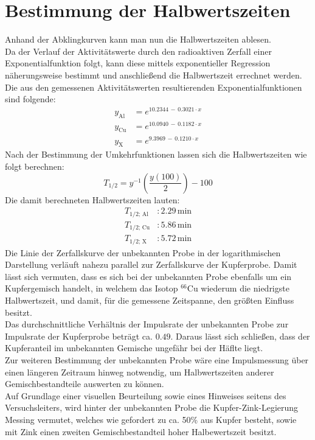 \documentclass[12pt,german]{article}
\begin{document}
    \section{Bestimmung der Halbwertszeiten}
    \noindent
    Anhand der Abklingkurven kann man nun die Halbwertszeiten ablesen. \\
    Da der Verlauf der Aktivitätswerte durch den radioaktiven Zerfall einer Exponentialfunktion folgt, kann diese mittels exponentieller Regression näherungsweise bestimmt und anschließend die Halbwertszeit errechnet werden.
    Die aus den gemessenen Aktivitätswerten resultierenden Exponentialfunktionen sind folgende:
    \begin{align*}
        y_\text{Al} &= e^{10.2344\, -\, 0.3021 \cdot x} \\
        y_\text{Cu} &= e^{10.0940\, - \, 0.1182 \cdot x} \\
        y_\text{X} &= e^{9.3969\, -\, 0.1210 \cdot x}
    \end{align*}
    Nach der Bestimmung der Umkehrfunktionen lassen sich die Halbwertszeiten wie folgt berechnen:
    \begin{equation*}
        T_{1/2} = y^{-1}\left(\frac{y(100)}{2}\right) - 100
    \end{equation*}
    Die damit berechneten Halbwertszeiten lauten:
    \begin{align*}
        T_{1/2;\, \text{Al}}&: 2.29\, \text{min} \\
        T_{1/2;\, \text{Cu}}&: 5.86\, \text{min} \\
        T_{1/2;\, \text{X}}&: 5.72\, \text{min}
    \end{align*}
    Die Linie der Zerfallskurve der unbekannten Probe in der logarithmischen Darstellung verläuft nahezu parallel zur Zerfallskurve der Kupferprobe.
    Damit lässt sich vermuten, dass es sich bei der unbekannten Probe ebenfalls um ein Kupfergemisch handelt, in welchem das Isotop \(^{66}\)Cu wiederum die niedrigste Halbwertszeit, und damit, für die gemessene Zeitspanne, den größten Einfluss besitzt. \\
    Das durchschnittliche Verhältnis der Impulsrate der unbekannten Probe zur Impulsrate der Kupferprobe beträgt ca. \(0.49\). Daraus lässt sich schließen, dass der Kupferanteil im unbekannten Gemische ungefähr bei der Häflte liegt. \\
    Zur weiteren Bestimmung der unbekannten Probe wäre eine Impulsmessung über einen längeren Zeitraum hinweg notwendig, um Halbwertszeiten anderer Gemischbestandteile auswerten zu können. \\
    Auf Grundlage einer visuellen Beurteilung sowie eines Hinweises seitens des Versuchsleiters, wird hinter der unbekannten Probe die Kupfer-Zink-Legierung Messing vermutet, welches wie gefordert zu ca. 50\% aus Kupfer besteht, sowie mit Zink einen zweiten Gemischbestandteil hoher Halbewertszeit besitzt.
\end{document}
